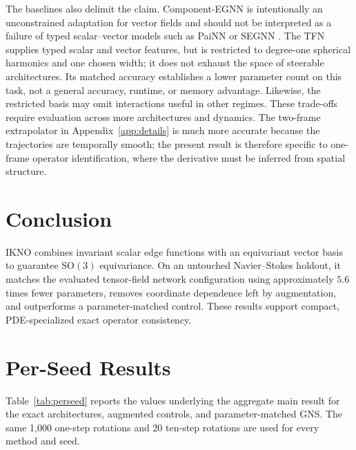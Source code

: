 \documentclass[mlmain]{jmlr}
\newcommand{\SO}{\mathrm{SO}(3)}
\newcommand{\IKNO}{\textsc{IKNO}}
\begin{document}
The baselines also delimit the claim. Component-EGNN is intentionally an
unconstrained adaptation for vector fields and should not be interpreted as a
failure of typed scalar--vector models such as PaiNN or SEGNN
\citep{schutt2021painn,brandstetter2022segnn}. The TFN supplies typed scalar and vector
features, but is restricted to degree-one spherical harmonics and one chosen
width; it does not exhaust the space of steerable architectures. Its matched
accuracy establishes a lower parameter count on this task, not a general
accuracy, runtime, or memory advantage. Likewise, the restricted basis may
omit interactions useful in other regimes. These trade-offs require evaluation
across more architectures and dynamics. The two-frame extrapolator in
Appendix~\ref{app:details} is much more accurate because the trajectories are
temporally smooth; the present result is therefore specific to one-frame
operator identification, where the derivative must be inferred from spatial
structure.

\section{Conclusion}
\label{sec:conclusion}

\IKNO{} combines invariant scalar edge functions with an equivariant vector
basis to guarantee $\SO$ equivariance. On an untouched Navier--Stokes holdout,
it matches the evaluated tensor-field network configuration using approximately
$5.6$ times fewer parameters, removes coordinate dependence left by
augmentation, and outperforms a parameter-matched control. These results
support compact, PDE-specialized exact operator consistency.



\appendix

\section{Per-Seed Results}
\label{app:perseed}

Table~\ref{tab:perseed} reports the values underlying the aggregate main
result for the exact architectures, augmented controls, and parameter-matched
GNS. The same 1,000 one-step rotations and 20 ten-step rotations are used for
every method and seed.
\end{document}
